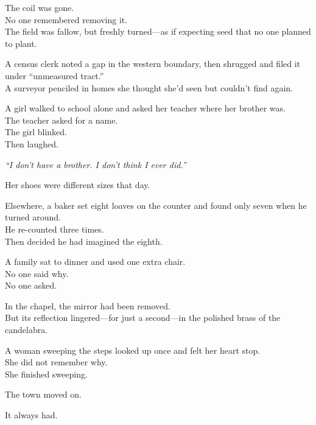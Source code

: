 \documentclass[12pt]{article}
\begin{document}
\vspace{0.5em}
The coil was gone.\\
No one remembered removing it.\\
The field was fallow, but freshly turned---as if expecting seed that no one planned to plant.

\vspace{0.5em}
A census clerk noted a gap in the western boundary, then shrugged and filed it under ``unmeasured tract.''\\
A surveyor penciled in homes she thought she’d seen but couldn’t find again.

\vspace{0.5em}
A girl walked to school alone and asked her teacher where her brother was.\\
The teacher asked for a name.\\
The girl blinked.\\
Then laughed.

\vspace{0.5em}
\textit{``I don’t have a brother. I don’t think I ever did.''}

\vspace{0.5em}
Her shoes were different sizes that day.

\vspace{0.5em}
Elsewhere, a baker set eight loaves on the counter and found only seven when he turned around.\\
He re-counted three times.\\
Then decided he had imagined the eighth.

\vspace{0.5em}
A family sat to dinner and used one extra chair.\\
No one said why.\\
No one asked.

\vspace{0.5em}
In the chapel, the mirror had been removed.\\
But its reflection lingered---for just a second---in the polished brass of the candelabra.

\vspace{0.5em}
A woman sweeping the steps looked up once and felt her heart stop.\\
She did not remember why.\\
She finished sweeping.

\vspace{0.5em}
The town moved on.

\vspace{0.5em}
It always had.
\end{document}
